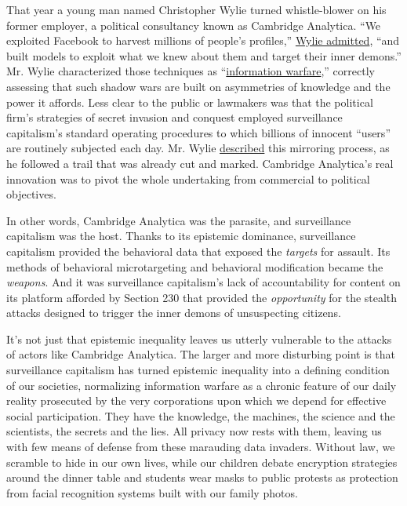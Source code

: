 That year a young man named Christopher Wylie turned whistle-blower on
his former employer, a political consultancy known as Cambridge
Analytica. ``We exploited Facebook to harvest millions of people's
profiles,''
\href{https://www.theguardian.com/news/2018/mar/17/cambridge-analytica-facebook-influence-us-election}{Wylie
admitted}, ``and built models to exploit what we knew about them and
target their inner demons.'' Mr. Wylie characterized those techniques as
``\href{https://www.politico.eu/article/cambridge-analytica-whistleblower-christopher-wylie-warns-of-new-cold-war-online/}{information
warfare},'' correctly assessing that such shadow wars are built on
asymmetries of knowledge and the power it affords. Less clear to the
public or lawmakers was that the political firm's strategies of secret
invasion and conquest employed surveillance capitalism's standard
operating procedures to which billions of innocent ``users'' are
routinely subjected each day. Mr. Wylie
\href{https://www.youtube.com/watch?time_continue=12\&v=FXdYSQ6nu-M\&feature=emb_logo}{described}
this mirroring process, as he followed a trail that was already cut and
marked. Cambridge Analytica's real innovation was to pivot the whole
undertaking from commercial to political objectives.

In other words, Cambridge Analytica was the parasite, and surveillance
capitalism was the host. Thanks to its epistemic dominance, surveillance
capitalism provided the behavioral data that exposed the \emph{targets}
for assault. Its methods of behavioral microtargeting and behavioral
modification became the \emph{weapons}. And it was surveillance
capitalism's lack of accountability for content on its platform afforded
by Section 230 that provided the \emph{opportunity} for the stealth
attacks designed to trigger the inner demons of unsuspecting citizens.

It's not just that epistemic inequality leaves us utterly vulnerable to
the attacks of actors like Cambridge Analytica. The larger and more
disturbing point is that surveillance capitalism has turned epistemic
inequality into a defining condition of our societies, normalizing
information warfare as a chronic feature of our daily reality prosecuted
by the very corporations upon which we depend for effective social
participation. They have the knowledge, the machines, the science and
the scientists, the secrets and the lies. All privacy now rests with
them, leaving us with few means of defense from these marauding data
invaders. Without law, we scramble to hide in our own lives, while our
children debate encryption strategies around the dinner table and
students wear masks to public protests as protection from facial
recognition systems built with our family photos.

